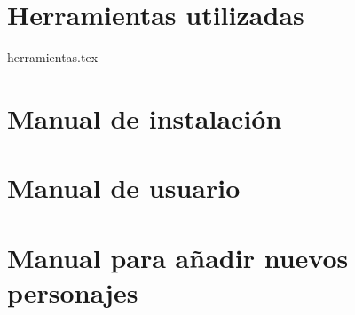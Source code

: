 \appendix
\chapter{Herramientas utilizadas}
 {herramientas.tex}
\chapter{Manual de instalación}

\chapter{Manual de usuario}

\chapter{Manual para añadir nuevos personajes}

